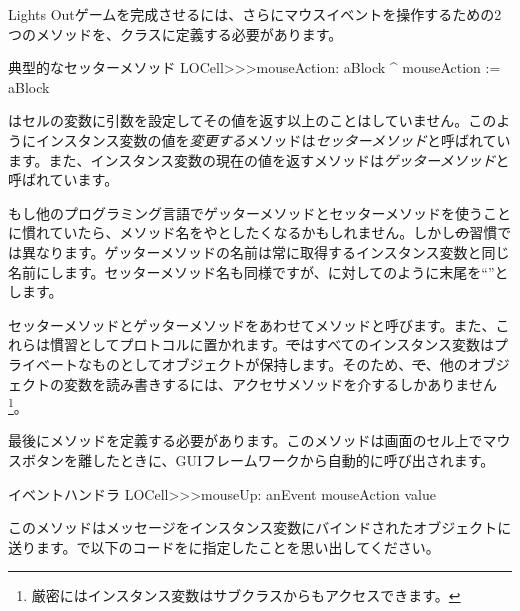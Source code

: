 \documentclass[a4paper,10pt,twoside]{book}
\begin{document}
Lights Outゲームを完成させるには、さらにマウスイベントを操作するための2つのメソッドを、クラスに定義する必要があります。

\begin{method}[mouseAction:]{典型的なセッターメソッド}
LOCell>>>mouseAction: aBlock
   ^ mouseAction := aBlock
\end{method}

 はセルの変数に引数を設定してその値を返す以上のことはしていません。このようにインスタンス変数の値を\emph{変更する}メソッドは\emph{セッターメソッド}と呼ばれています。また、インスタンス変数の現在の値を返すメソッドは\emph{ゲッターメソッド}と呼ばれています。

もし他のプログラミング言語でゲッターメソッドとセッターメソッドを使うことに慣れていたら、メソッド名をやとしたくなるかもしれません。しかし\st の習慣では異なります。ゲッターメソッドの名前は常に取得するインスタンス変数と同じ名前にします。セッターメソッド名も同様ですが、に対してのように末尾を``\ct{:}''とします。

セッターメソッドとゲッターメソッドをあわせてメソッドと呼びます。また、これらは慣習としてプロトコルに置かれます。\st ではすべてのインスタンス変数はプライベートなものとしてオブジェクトが保持します。そのため、\st で、他のオブジェクトの変数を読み書きするには、アクセサメソッドを介するしかありません\footnote{厳密にはインスタンス変数はサブクラスからもアクセスできます。}。


最後にメソッドを定義する必要があります。このメソッドは画面のセル上でマウスボタンを離したときに、GUIフレームワークから自動的に呼び出されます。

\begin{method}[sbecellmouseup]{イベントハンドラ}
LOCell>>>mouseUp: anEvent
   mouseAction value
\end{method}



このメソッドはメッセージをインスタンス変数にバインドされたオブジェクトに送ります。で以下のコードをに指定したことを思い出してください。
\end{document}

